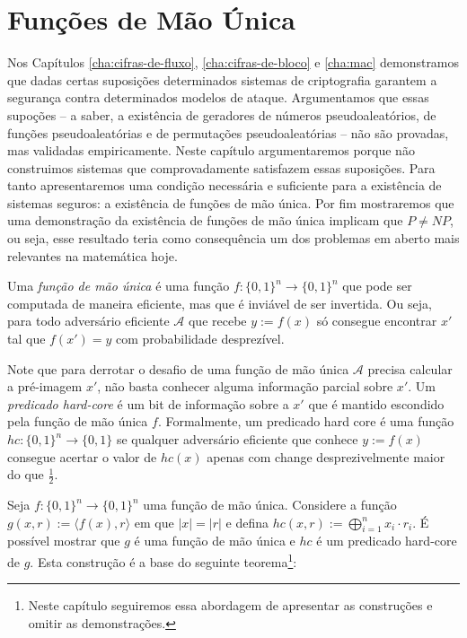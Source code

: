 \chapter{Funções de Mão Única}
\label{cha:owf}

Nos Capítulos \ref{cha:cifras-de-fluxo}, \ref{cha:cifras-de-bloco} e \ref{cha:mac} demonstramos que dadas certas suposições determinados sistemas de criptografia garantem a segurança contra determinados modelos de ataque.
Argumentamos que essas supoções -- a saber, a existência de geradores de números pseudoaleatórios, de funções pseudoaleatórias e de permutações pseudoaleatórias -- não são provadas, mas validadas empiricamente.
Neste capítulo argumentaremos porque não construimos sistemas que comprovadamente satisfazem essas suposições.
Para tanto apresentaremos uma condição necessária e suficiente para a existência de sistemas seguros: a existência de funções de mão única.
Por fim mostraremos que uma demonstração da existência de funções de mão única implicam que $P \neq NP$, ou seja, esse resultado teria como consequência um dos problemas em aberto mais relevantes na matemática hoje.

Uma {\em função de mão única} é uma função $f: \{0,1\}^n \to \{0,1\}^n$ que pode ser computada de maneira eficiente, mas que é inviável de ser invertida.
Ou seja, para todo adversário eficiente $\mathcal{A}$ que recebe $y := f(x)$ só consegue encontrar $x'$ tal que $f(x') = y$ com probabilidade desprezível.


Note que para derrotar o desafio de uma função de mão única $\mathcal{A}$ precisa calcular a pré-imagem $x'$, não basta conhecer alguma informação parcial sobre $x'$.
Um {\em predicado hard-core} é um bit de informação sobre a $x'$ que é mantido escondido pela função de mão única $f$.
Formalmente, um predicado hard core é uma função $hc:\{0,1\}^n \to \{0,1\}$ se qualquer adversário eficiente que conhece $y := f(x)$ consegue acertar o valor de $hc(x)$ apenas com change desprezivelmente maior do que $\frac{1}{2}$.


Seja $f:\{0,1\}^n \to \{0,1\}^n$ uma função de mão única.
Considere a função $g(x,r) := \langle f(x), r \rangle$ em que $|x| = |r|$ e defina $hc(x,r) := \bigoplus_{i=1}^nx_i \cdot r_i$.
É possível mostrar que $g$ é uma função de mão única e $hc$ é um predicado hard-core de $g$.
Esta construção é a base do seguinte teorema\footnote{Neste capítulo seguiremos essa abordagem de apresentar as construções e omitir as demonstrações.}:

